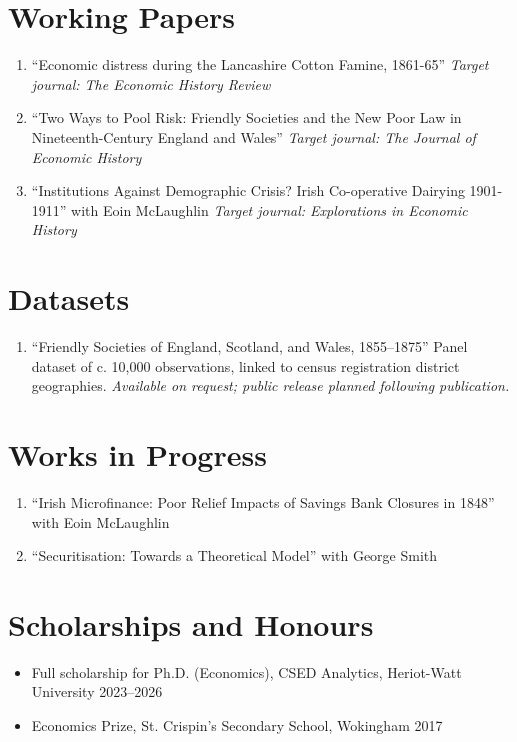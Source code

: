 \documentclass[11pt,a4paper]{article}
\begin{document}
\section{Working Papers}
\begin{enumerate}
    \item ``Economic distress during the Lancashire Cotton Famine, 1861-65''
    \textit{\newline Target journal: The Economic History Review}
    \item ``Two Ways to Pool Risk: Friendly Societies and the New Poor Law in Nineteenth-Century England and Wales''
    \textit{\newline Target journal: The Journal of Economic History}
    \item ``Institutions Against Demographic Crisis? Irish Co-operative Dairying 1901-1911'' \newline with Eoin McLaughlin 
    \textit{\newline Target journal: Explorations in Economic History}
\end{enumerate}

\section{Datasets}
\begin{enumerate}
    \item []``Friendly Societies of England, Scotland, and Wales, 1855–1875'' \newline Panel dataset of c. 10,000 observations, linked to census registration district geographies. \newline \textit{Available on request; public release planned following publication.}
\end{enumerate}

\section{Works in Progress}
\begin{enumerate}
    \item ``Irish Microfinance: Poor Relief Impacts of Savings Bank Closures in 1848'' \newline with Eoin McLaughlin
    \item ``Securitisation: Towards a Theoretical Model'' \newline with George Smith
\end{enumerate}

\section{Scholarships and Honours}
\begin{itemize}
    \item [] Full scholarship for Ph.D. (Economics), CSED Analytics, Heriot-Watt University \hfill 2023--2026 
    \item [] Economics Prize, St. Crispin's Secondary School, Wokingham \hfill 2017
\end{itemize}
\end{document}
